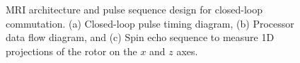 \documentclass[journal]{IEEEtran}
\begin{document}
\begin{figure}
\begin{center}
\end{center}
\caption{MRI architecture and pulse sequence design for closed-loop commutation. (a) Closed-loop pulse timing diagram, (b) Processor data flow diagram, and (c) Spin echo sequence to measure 1D projections of the rotor on the $x$ and $z$ axes.}
\vspace{-5pt}
\end{figure}
\end{document}
